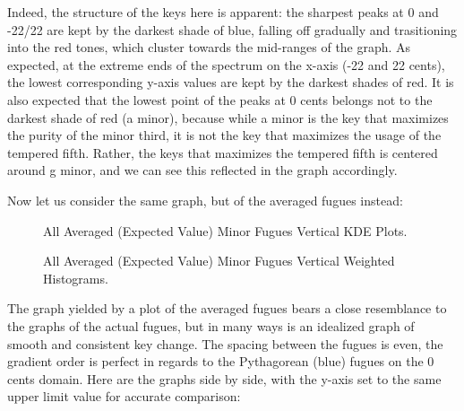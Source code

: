 Indeed, the structure of the keys here is apparent: the sharpest peaks
at 0 and -22/22 are kept by the darkest shade of blue, falling off
gradually and trasitioning into the red tones, which cluster towards the
mid-ranges of the graph. As expected, at the extreme ends of the
spectrum on the x-axis (-22 and 22 cents), the lowest corresponding
y-axis values are kept by the darkest shades of red. It is also expected
that the lowest point of the peaks at 0 cents belongs not to the darkest
shade of red (a minor), because while a minor is the key that maximizes
the purity of the minor third, it is not the key that maximizes the
usage of the tempered fifth. Rather, the keys that maximizes the
tempered fifth is centered around g minor, and we can see this reflected
in the graph accordingly.

Now let us consider the same graph, but of the averaged fugues instead:




\begin{figure}[H]
    \begin{center}
    \caption{All Averaged (Expected Value) Minor Fugues Vertical KDE Plots. }
    \end{center}
\end{figure}
    



\begin{figure}[H]
    \begin{center}
    \caption{All Averaged (Expected Value) Minor Fugues Vertical Weighted Histograms. }
    \end{center}
\end{figure}
    
    The graph yielded by a plot of the averaged fugues bears a close
resemblance to the graphs of the actual fugues, but in many ways is an
idealized graph of smooth and consistent key change. The spacing between
the fugues is even, the gradient order is perfect in regards to the
Pythagorean (blue) fugues on the 0 cents domain. Here are the graphs
side by side, with the y-axis set to the same upper limit value for
accurate comparison:


    \begin{center}
    \end{center}
    


